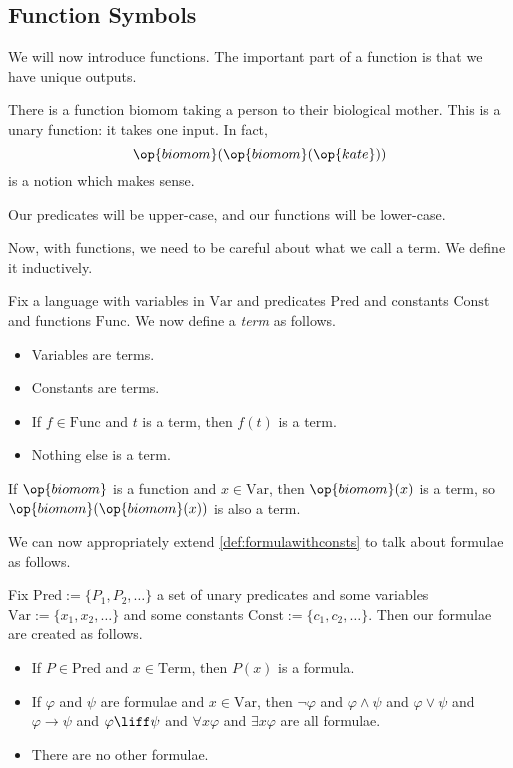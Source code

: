 \documentclass[../notes.tex]{subfiles}
\begin{document}
\subsection{Function Symbols}
We will now introduce functions. The important part of a function is that we have unique outputs.
\begin{example}
	There is a function $\mathrm{biomom}$ taking a person to their biological mother. This is a unary function: it takes one input. In fact,
	\[\op{biomom}(\op{biomom}(\op{kate}))\]
	is a notion which makes sense.
\end{example}
\begin{remark}
	Our predicates will be upper-case, and our functions will be lower-case.
\end{remark}
Now, with functions, we need to be careful about what we call a term. We define it inductively.
\begin{definition}[Term]
	Fix a language with variables in $\mathrm{Var}$ and predicates $\mathrm{Pred}$ and constants $\mathrm{Const}$ and functions $\mathrm{Func}$. We now define a \textit{term} as follows.
	\begin{itemize}
		\item Variables are terms.
		\item Constants are terms.
		\item If $f\in\mathrm{Func}$ and $t$ is a term, then $f(t)$ is a term.
		\item Nothing else is a term.
	\end{itemize}
\end{definition}
\begin{example}
	If $\op{biomom}$ is a function and $x\in\mathrm{Var}$, then $\op{biomom}(x)$ is a term, so $\op{biomom}(\op{biomom}(x))$ is also a term.
\end{example}
We can now appropriately extend \autoref{def:formulawithconsts} to talk about formulae as follows.
\begin{defihelper}
	Fix $\mathrm{Pred}:=\{P_1,P_2,\ldots\}$ a set of unary predicates and some variables $\mathrm{Var}:=\{x_1,x_2,\ldots\}$ and some constants $\mathrm{Const}:=\{c_1,c_2,\ldots\}$. Then our formulae are created as follows.
	\begin{itemize}
		\item If $P\in\mathrm{Pred}$ and $x\in\mathrm{Term}$, then $P(x)$ is a formula.
		\item If $\varphi$ and $\psi$ are formulae and $x\in\mathrm{Var}$, then $\lnot\varphi$ and $\varphi\land\psi$ and $\varphi\lor\psi$ and $\varphi\to\psi$ and $\varphi\liff\psi$ and $\forall x\varphi$ and $\exists x\varphi$ are all formulae.
		\item There are no other formulae.
	\end{itemize}
\end{defihelper}
\end{document}
